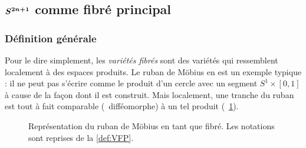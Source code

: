 \subsection{$\bf{S^{2n+1}}$ comme fibré principal} \label{subsec:VFP}

\subsubsection{Définition générale}\label{subsec:def2VFP}

Pour le dire simplement, les \emph{variétés fibrés} sont des variétés qui ressemblent localement à des espaces produits. 
Le ruban de Möbius en est un exemple typique : il ne peut pas s'écrire comme le produit d'un cercle avec un segment $S^{1}\times [0,1]$ à cause de la façon dont il est construit. Mais localement, une tranche du ruban est tout à fait comparable (\ie~difféomorphe) à un tel produit (\cf~\cref{fig:ruban2modius}).
\begin{figure}[h]
	
	\caption[\DONE Ruban de Möbius comme variété fibrée]{Représentation du ruban de Möbius en tant que fibré. Les notations sont reprises de la \cref{def:VFP}.}
	\label{fig:ruban2modius}
\end{figure}
\skipl

